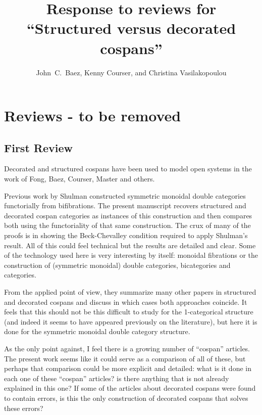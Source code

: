\documentclass[reqno]{amsart}
\title{Response to reviews for ``Structured versus decorated cospans''}
\author{John\ C.\ Baez, Kenny Courser, and Christina Vasilakopoulou}
\begin{document}
\maketitle

\setcounter{tocdepth}{2}
\tableofcontents

\section{Reviews - to be removed}

\subsection{First Review}

{\footnotesize

Decorated and structured cospans have been used to model open systems in the work of Fong, Baez, Courser, Master and others.

Previous work by Shulman constructed symmetric monoidal double categories functorially from bifibrations. The present manuscript recovers structured 
and decorated cospan categories as instances of this construction and then compares both using the functoriality of that same construction. The crux 
of many of the proofs is in showing the Beck-Chevalley condition required to apply Shulman’s result. All of this could feel technical but the results 
are detailed and clear. Some of the technology used here is very interesting by itself: monoidal fibrations or the construction of (symmetric 
monoidal) double categories, bicategories and categories.

From the applied point of view, they summarize many other papers in structured and decorated cospans and discuss in which cases both approaches 
coincide. It feels that this should not be this difficult to study for the 1-categorical structure (and indeed it seems to have appeared previously on 
the literature), but here it is done for the symmetric monoidal double category structure.

As the only point against, I feel there is a growing number of “cospan” articles. The present work seems like it could serve as a comparison of all of 
these, but perhaps that comparison could be more explicit and detailed: what is it done in each one of these “cospan” articles? is there anything that 
is not already explained in this one? If some of the articles about decorated cospans were found to contain errors, is this the only construction of 
decorated cospans that solves these errors?

}
\end{document}

